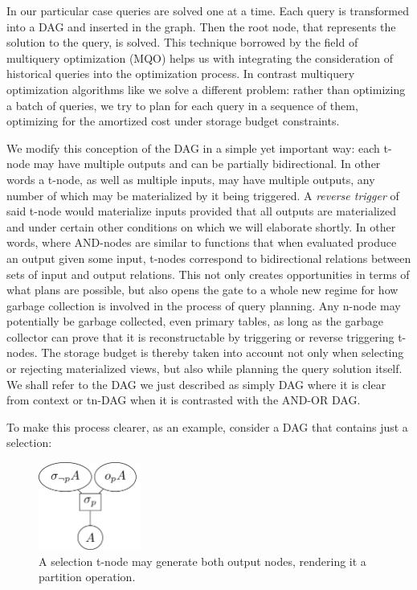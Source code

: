 In our particular case queries are solved one at a time. Each query is
transformed into a DAG and inserted in the graph. Then the root node,
that represents the solution to the query, is solved. This technique
borrowed by the field of multiquery optimization (MQO) helps us with
integrating the consideration of historical queries into the
optimization process. In contrast multiquery optimization algorithms
like \cite{mistryMaterializedViewSelection2001} we solve a different
problem: rather than optimizing a batch of queries, we try to plan for
each query in a sequence of them, optimizing for the amortized cost
under storage budget constraints.

We modify this conception of the DAG in a simple yet important way:
each t-node may have multiple outputs and can be partially
bidirectional. In other words a t-node, as well as multiple inputs,
may have multiple outputs, any number of which may be materialized by
it being triggered. A \emph{reverse trigger} of said t-node would
materialize inputs provided that all outputs are materialized and
under certain other conditions on which we will elaborate shortly. In
other words, where AND-nodes are similar to functions that when
evaluated produce an output given some input, t-nodes correspond to
bidirectional relations between sets of input and output
relations. This not only creates opportunities in terms of what plans
are possible, but also opens the gate to a whole new regime for how
garbage collection is involved in the process of query planning. Any
n-node may potentially be garbage collected, even primary tables, as
long as the garbage collector can prove that it is reconstructable by
triggering or reverse triggering t-nodes. The storage budget is
thereby taken into account not only when selecting or rejecting
materialized views, but also while planning the query solution
itself. We shall refer to the DAG we just described as simply DAG
where it is clear from context or tn-DAG when it is contrasted with
the AND-OR DAG.

To make this process clearer, as an example, consider a DAG that
contains just a selection:

\begin{figure}[p]
  \centering
  \includegraphics[width=0.3\textwidth]{./imgs/selnet.pdf}
  \caption{\label{fig:org381fe98}A selection t-node may generate both output nodes, rendering it a partition operation.}
\end{figure}

